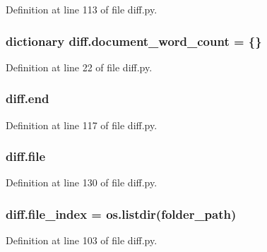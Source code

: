 Definition at line 113 of file diff.\+py.

\subsubsection[{\texorpdfstring{document\+\_\+word\+\_\+count}{document_word_count}}]{\setlength{\rightskip}{0pt plus 5cm}dictionary diff.\+document\+\_\+word\+\_\+count = \{\}}\hypertarget{namespacediff_af16edaaafe4787892cb925870fd0d108}{}\label{namespacediff_af16edaaafe4787892cb925870fd0d108}


Definition at line 22 of file diff.\+py.

\subsubsection[{\texorpdfstring{end}{end}}]{\setlength{\rightskip}{0pt plus 5cm}diff.\+end}\hypertarget{namespacediff_a2839fdf2e0df35c347f0649098c5ecdc}{}\label{namespacediff_a2839fdf2e0df35c347f0649098c5ecdc}


Definition at line 117 of file diff.\+py.

\subsubsection[{\texorpdfstring{file}{file}}]{\setlength{\rightskip}{0pt plus 5cm}diff.\+file}\hypertarget{namespacediff_a3759e132757b6fdecd117a665d6158ab}{}\label{namespacediff_a3759e132757b6fdecd117a665d6158ab}


Definition at line 130 of file diff.\+py.

\subsubsection[{\texorpdfstring{file\+\_\+index}{file_index}}]{\setlength{\rightskip}{0pt plus 5cm}diff.\+file\+\_\+index = os.\+listdir({\bf folder\+\_\+path})}\hypertarget{namespacediff_a9c223d5f0415c68743de6a689c3bea0b}{}\label{namespacediff_a9c223d5f0415c68743de6a689c3bea0b}


Definition at line 103 of file diff.\+py.

